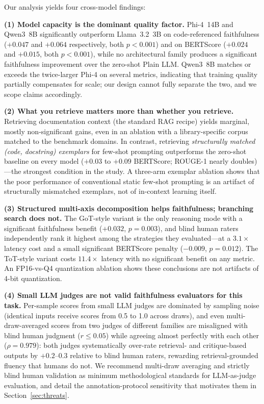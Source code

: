 \documentclass[pdflatex,sn-mathphys-ay]{sn-jnl}%
\theoremstyle{thmstyleone}%
\theoremstyle{thmstyletwo}%
\theoremstyle{thmstylethree}%
\begin{document}
Our analysis yields four cross-model findings:

\textbf{(1) Model capacity is the dominant quality factor.} Phi-4~14B and Qwen3~8B significantly outperform Llama~3.2~3B on code-referenced faithfulness ($+0.047$ and $+0.064$ respectively, both $p<0.001$) and on BERTScore ($+0.024$ and $+0.015$, both $p<0.001$), while no architectural family produces a significant faithfulness improvement over the zero-shot Plain LLM. Qwen3~8B matches or exceeds the twice-larger Phi-4 on several metrics, indicating that training quality partially compensates for scale; our design cannot fully separate the two, and we scope claims accordingly.

\textbf{(2) What you retrieve matters more than whether you retrieve.} Retrieving documentation context (the standard RAG recipe) yields marginal, mostly non-significant gains, even in an ablation with a library-specific corpus matched to the benchmark domains. In contrast, retrieving \emph{structurally matched (code, docstring) exemplars} for few-shot prompting outperforms the zero-shot baseline on every model ($+0.03$ to $+0.09$ BERTScore; ROUGE-1 nearly doubles)---the strongest condition in the study. A three-arm exemplar ablation shows that the poor performance of conventional static few-shot prompting is an artifact of structurally mismatched exemplars, not of in-context learning itself.

\textbf{(3) Structured multi-axis decomposition helps faithfulness; branching search does not.} The GoT-style variant is the only reasoning mode with a significant faithfulness benefit ($+0.032$, $p=0.003$), and blind human raters independently rank it highest among the strategies they evaluated---at a $3.1\times$ latency cost and a small significant BERTScore penalty ($-0.009$, $p=0.012$). The ToT-style variant costs $11.4\times$ latency with no significant benefit on any metric. An FP16-vs-Q4 quantization ablation shows these conclusions are not artifacts of 4-bit quantization.

\textbf{(4) Small LLM judges are not valid faithfulness evaluators for this task.} Per-sample scores from small LLM judges are dominated by sampling noise (identical inputs receive scores from 0.5 to 1.0 across draws), and even multi-draw-averaged scores from two judges of different families are misaligned with blind human judgment ($r\le0.05$) while agreeing almost perfectly with each other ($\rho=0.979$): both judges systematically over-rate retrieval- and critique-based outputs by $+0.2$--$0.3$ relative to blind human raters, rewarding retrieval-grounded fluency that humans do not. We recommend multi-draw averaging and strictly blind human validation as minimum methodological standards for LLM-as-judge evaluation, and detail the annotation-protocol sensitivity that motivates them in Section~\ref{sec:threats}.
\end{document}
